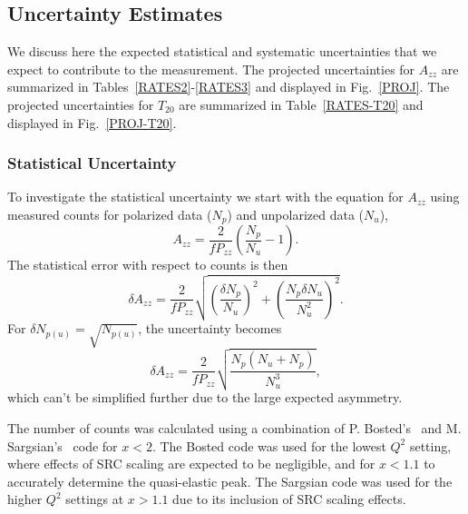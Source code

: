 \subsection{Uncertainty Estimates}
\label{uncertainties}
We discuss here the expected statistical and systematic uncertainties that we expect to contribute to the measurement. The projected uncertainties for $A_{zz}$ are summarized in Tables~\ref{RATES2}-\ref{RATES3} and displayed in Fig.~\ref{PROJ}. 
The projected uncertainties for $T_{20}$ are summarized in Table~\ref{RATES-T20} and displayed in Fig.~\ref{PROJ-T20}.  

\subsubsection{Statistical Uncertainty}
\label{stat}
To investigate the statistical uncertainty we start with the equation for $A_{zz}$ using
measured counts for polarized data ($N_p$) and unpolarized data ($N_u$), 
\begin{equation}
A_{zz}=\frac{2}{fP_{zz}}\left(\frac{N_p}{N_u}-1\right).
\end{equation}
The statistical error with respect to counts is then
\begin{equation}
\delta A_{zz}=\frac{2}{fP_{zz}}\sqrt{\left(\frac{\delta N_p}{N_u}\right)^2+\left(\frac{N_p\delta N_u}{N_u^2}\right)^2}.
\end{equation}
For $\delta N_{p(u)}=\sqrt{N_{p(u)}}$, the uncertainty becomes
\begin{equation}
\label{dAzz}
\delta A_{zz}=\frac{2}{fP_{zz}}\sqrt{\frac{N_p(N_u + N_p)}{N_u^3}},
\end{equation}
which can't be simplified further due to the large expected asymmetry.

The number of counts was calculated using a combination of P. Bosted's~\cite{Bosted:2012qc} and M. Sargsian's~\cite{misak-convo} code for $x<2$. The Bosted code was used for the lowest $Q^2$ setting, where effects of SRC scaling are expected to be negligible, and for $x<1.1$ to accurately determine the quasi-elastic peak. The Sargsian code was used for the higher $Q^2$ settings at $x>1.1$ due to its inclusion of SRC scaling effects.

